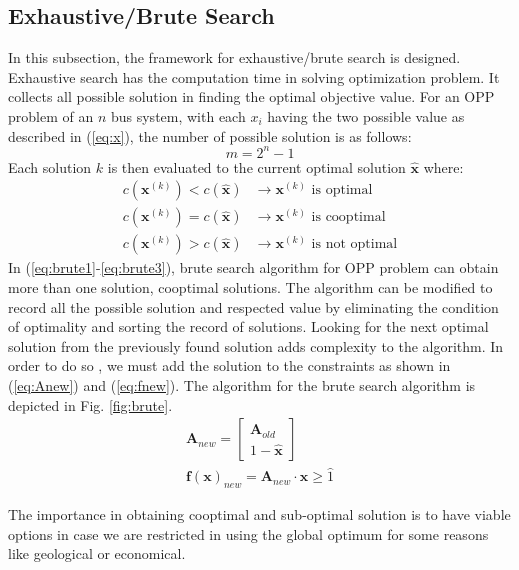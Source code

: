\documentclass[conference]{IEEEtran}
\begin{document}
\subsection{Exhaustive/Brute Search}
In this subsection, the framework for exhaustive/brute search is designed. Exhaustive search has the computation time in solving optimization problem. It collects all possible solution in finding the optimal objective value. For an OPP problem of an $n$ bus system, with each $x_i$ having the two possible value as described in (\ref{eq:x}), the number of possible solution is as follows:
\begin{equation}
	m = 2^n-1
\end{equation}
Each solution $k$ is then evaluated to the current optimal solution $\hat{\mathbf{x}}$ where:
\begin{align}
	c(\mathbf{x}^{(k)})<c(\hat{\mathbf{x}}) &\rightarrow \text{$\mathbf{x}^{(k)}$ is optimal} \label{eq:brute1} \\
	c(\mathbf{x}^{(k)})=c(\hat{\mathbf{x}})&\rightarrow \text{$\mathbf{x}^{(k)}$ is cooptimal} \label{eq:brute2} \\
	c(\mathbf{x}^{(k)})>c(\hat{\mathbf{x}}) &\rightarrow \text{$\mathbf{x}^{(k)}$ is not optimal} \label{eq:brute3}
\end{align}
In (\ref{eq:brute1}-\ref{eq:brute3}), brute search algorithm for OPP problem can obtain more than one solution, cooptimal solutions. The algorithm can be modified to record all the possible solution and respected value by eliminating the condition of optimality and sorting the record of solutions. Looking for the next optimal solution from the previously found solution adds complexity to the algorithm. In order to do so , we must add the solution to the constraints as shown in (\ref{eq:Anew}) and (\ref{eq:fnew}). The algorithm for the brute search algorithm is depicted in Fig. \ref{fig:brute}.
\begin{gather}
	\mathbf{A}_{new} = \begin{bmatrix}
		\mathbf{A}_{old} \\
		1-\hat{\mathbf{x}}
	\end{bmatrix} \label{eq:Anew}\\
	\mathbf{f}(\mathbf{x})_{new} = \mathbf{A}_{new} \cdot \mathbf{x} \geq \hat{1} \label{eq:fnew}
\end{gather}

The importance in obtaining cooptimal and sub-optimal solution is to have viable options in case we are restricted in using the global optimum for some reasons like geological or economical.
\end{document}
